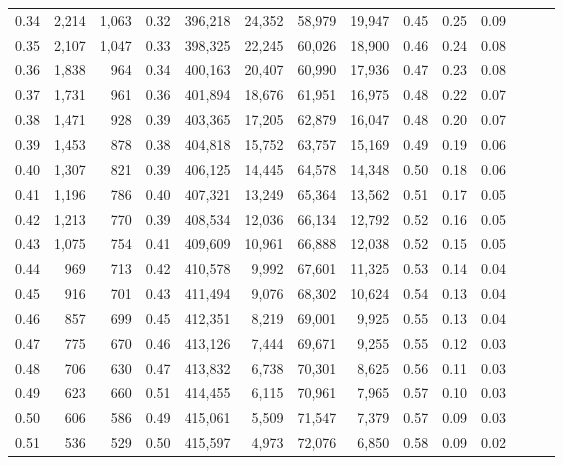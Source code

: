 \begin{tabular}{rrrrrrrrrrrrrr}
0.34 &   2,214 &  1,063 &  0.32 &  396,218 &   24,352 &  58,979 &  19,947 &  0.45 &  0.25 &      0.09 \\
0.35 &   2,107 &  1,047 &  0.33 &  398,325 &   22,245 &  60,026 &  18,900 &  0.46 &  0.24 &      0.08 \\
0.36 &   1,838 &    964 &  0.34 &  400,163 &   20,407 &  60,990 &  17,936 &  0.47 &  0.23 &      0.08 \\
0.37 &   1,731 &    961 &  0.36 &  401,894 &   18,676 &  61,951 &  16,975 &  0.48 &  0.22 &      0.07 \\
0.38 &   1,471 &    928 &  0.39 &  403,365 &   17,205 &  62,879 &  16,047 &  0.48 &  0.20 &      0.07 \\
0.39 &   1,453 &    878 &  0.38 &  404,818 &   15,752 &  63,757 &  15,169 &  0.49 &  0.19 &      0.06 \\
0.40 &   1,307 &    821 &  0.39 &  406,125 &   14,445 &  64,578 &  14,348 &  0.50 &  0.18 &      0.06 \\
0.41 &   1,196 &    786 &  0.40 &  407,321 &   13,249 &  65,364 &  13,562 &  0.51 &  0.17 &      0.05 \\
0.42 &   1,213 &    770 &  0.39 &  408,534 &   12,036 &  66,134 &  12,792 &  0.52 &  0.16 &      0.05 \\
0.43 &   1,075 &    754 &  0.41 &  409,609 &   10,961 &  66,888 &  12,038 &  0.52 &  0.15 &      0.05 \\
0.44 &     969 &    713 &  0.42 &  410,578 &    9,992 &  67,601 &  11,325 &  0.53 &  0.14 &      0.04 \\
0.45 &     916 &    701 &  0.43 &  411,494 &    9,076 &  68,302 &  10,624 &  0.54 &  0.13 &      0.04 \\
0.46 &     857 &    699 &  0.45 &  412,351 &    8,219 &  69,001 &   9,925 &  0.55 &  0.13 &      0.04 \\
0.47 &     775 &    670 &  0.46 &  413,126 &    7,444 &  69,671 &   9,255 &  0.55 &  0.12 &      0.03 \\
0.48 &     706 &    630 &  0.47 &  413,832 &    6,738 &  70,301 &   8,625 &  0.56 &  0.11 &      0.03 \\
0.49 &     623 &    660 &  0.51 &  414,455 &    6,115 &  70,961 &   7,965 &  0.57 &  0.10 &      0.03 \\
0.50 &     606 &    586 &  0.49 &  415,061 &    5,509 &  71,547 &   7,379 &  0.57 &  0.09 &      0.03 \\
0.51 &     536 &    529 &  0.50 &  415,597 &    4,973 &  72,076 &   6,850 &  0.58 &  0.09 &      0.02 \\

\end{tabular}
